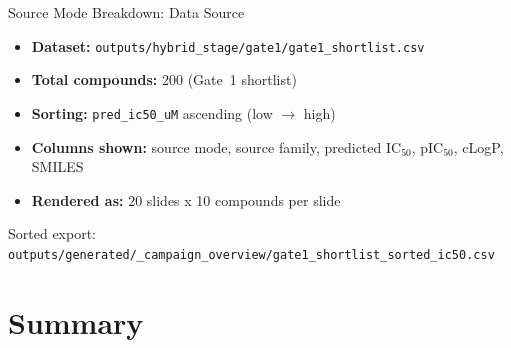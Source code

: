 \documentclass[aspectratio=169]{beamer}
\begin{document}
\begin{frame}{Source Mode Breakdown: Data Source}
  \small
  \begin{itemize}
    \item \textbf{Dataset:} \texttt{outputs/hybrid\_stage/gate1/gate1\_shortlist.csv}
    \item \textbf{Total compounds:} 200 (Gate~1 shortlist)
    \item \textbf{Sorting:} \texttt{pred\_ic50\_uM} ascending (low $\rightarrow$ high)
    \item \textbf{Columns shown:} source mode, source family, predicted IC$_{50}$, pIC$_{50}$, cLogP, SMILES
    \item \textbf{Rendered as:} 20 slides x 10 compounds per slide
  \end{itemize}
  \vspace{0.3em}
  {\footnotesize Sorted export: \texttt{outputs/generated/\_campaign\_overview/gate1\_shortlist\_sorted\_ic50.csv}}
\end{frame}



\section{Summary}
\end{document}
